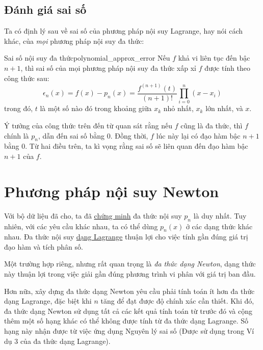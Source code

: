 \documentclass[../../Lectures]{subfiles}
\begin{document}
\subsection{Đánh giá sai số}

Ta có định lý sau về sai số của phương pháp nội suy Lagrange, hay nói cách khác,
của \emph{mọi} phương pháp nội suy đa thức:

\begin{ctheorem}{Sai số nội suy đa thức}{polynomial_approx_error}
    Nếu \(f\) khả vi liên tục đến bậc \(n + 1\), thì sai số của mọi phương pháp
    nội suy đa thức xấp xỉ \(f\) được tính theo công thức sau:
    \begin{equation}\label{eq:polynomial_approx_error}
        \epsilon_n(x) = f(x) - p_n(x) = \frac{f^{(n + 1)}(t)}{(n + 1)!} \prod_{i = 0}^{n} (x - x_i)
    \end{equation}
    trong đó, \(t\) là một số nào đó trong khoảng giữa \(x_k\) nhỏ nhất, \(x_k\)
    lớn nhất, và \(x\).
\end{ctheorem}

Ý tưởng của công thức trên đến từ quan sát rằng nếu \(f\) cũng là đa thức, thì
\(f\) chính là \(p_n\), dẫn đến sai số bằng \(0\). Đồng thời, \(f\) lúc này lại
có đạo hàm bậc \(n + 1\) bằng \(0\). Từ hai điều trên, ta kì vọng rằng sai số sẽ
liên quan đến đạo hàm bậc \(n + 1\) của \(f\).




\section{Phương pháp nội suy Newton}

Với bộ dữ liệu đã cho, ta đã \hyperref[proof:polynomial_approx_uniqueness]{chứng
minh} đa thức nội suy \(p_n\) là duy nhất. Tuy nhiên, với các yêu cầu khác nhau,
ta có thể dùng \(p_n(x)\) ở các dạng thức khác nhau. Đa thức nội suy
\hyperref[method:lagrange_approx]{dạng Lagrange} thuận lợi cho việc tính gần
đúng giá trị đạo hàm và tích phân số.

Một trường hợp riêng, nhưng rất quan trọng là \emph{đa thức dạng Newton}, dạng
thức này thuận lợi trong việc giải gần đúng phương trình vi phân với giá trị ban
đầu.

Hơn nữa, xây dựng đa thức dạng Newton yêu cầu phải tính toán ít hơn đa thức dạng
Lagrange, đặc biệt khi \(n\) tăng để đạt được độ chính xác cần thiết. Khi đó, đa
thức dạng Newton sử dụng tất cả các kết quả tính toán từ trước đó và cộng thêm
một số hạng khác có thể không được tính từ đa thức dạng Lagrange. Số hạng này
nhận được từ việc ứng dụng Nguyên lý sai số (Được sử dụng trong Ví dụ 3 của đa
thức dạng Lagrange).
\end{document}
